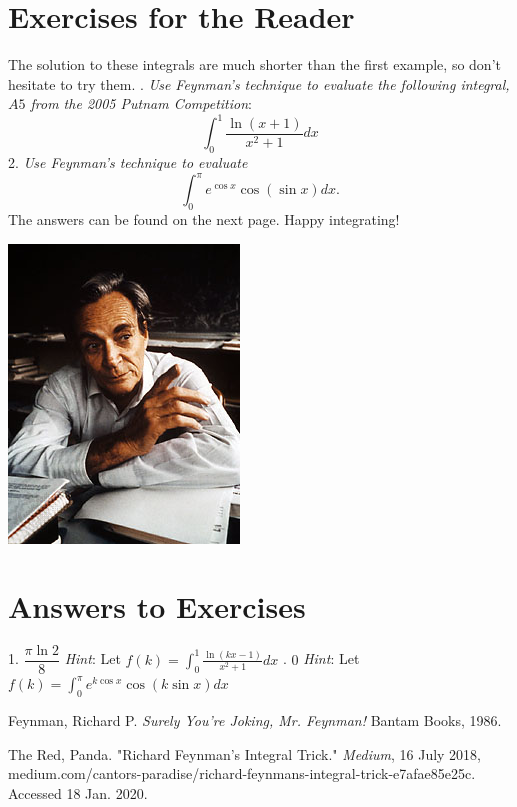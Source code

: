 \documentclass{article}
\begin{document}
\section*{Exercises for the Reader}
The solution to these integrals are much shorter than the first example, so don't hesitate to try them.
\newline {}. \textit{Use Feynman's technique to evaluate the following integral, $A5$ from the 2005 Putnam Competition}:
$$\int_{0}^{1}\frac{\ln(x+1)}{x^2+1}dx$$
2. \textit{Use Feynman's technique to evaluate}
$$\int_{0}^{\pi}e^{\cos{x}}\cos{(\sin{x})}dx.$$
The answers can be found on the next page. Happy integrating!
\newline
\begin{center}
    \includegraphics[scale=0.5]{feynman}
\end{center}

\newpage
\section*{Answers to Exercises}
1. $\boxed{\dfrac{\pi\ln{2}}{8}}$
\newline \textit{Hint}: Let $\displaystyle{f(k)=\int_{0}^{1}\frac{\ln({kx-1})}{x^2+1}}dx$
\newline {}. $\boxed{0}$
\newline \textit{Hint}: Let $\displaystyle{f(k)=\int_{0}^{\pi}e^{k\cos{x}}\cos({k\sin{x}})}dx$
\begin{thebibliography}{2}
Feynman, Richard P.
\textit{Surely You're Joking, Mr. Feynman!}
Bantam Books, 1986.

The Red, Panda. "Richard Feynman's Integral Trick." 
\textit{Medium}, 16 July 2018, medium.com/cantors-paradise/richard-feynmans-integral-trick-e7afae85e25c. Accessed 18 Jan. 2020.
\end{thebibliography}
\end{document}
